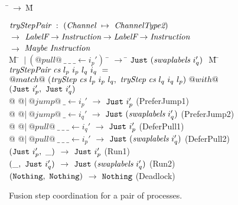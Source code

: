 
\newcommand\note[1]{\textcolor{notec}{(#1)}}

\begin{figure}
\begin{tabbing}
\=$~\to~$\=M\kill

$\textit{tryStepPair} ~:~ (\textit{Channel} ~\mapsto~ \textit{ChannelType2})$ \\
\> $\to$ \> $\textit{LabelF} \to \textit{Instruction} \to \textit{LabelF} \to \textit{Instruction}$ \\
\> $\to$ \> $\textit{Maybe}~\textit{Instruction}$ \\

M \= $~|~(@pull@~\_~\_~\_ \gets i_p')~$ \= $\to$ \= $\texttt{Just}~ (\textit{swaplabels}~i_q')~$ \= M \=\kill
$\textit{tryStepPair} ~\textit{cs}~l_p~i_p~l_q~i_q~=$ \\
\> $@match@~ (\textit{tryStep}~\textit{cs}~l_p~i_p~l_q,~\textit{tryStep}~\textit{cs}~l_q~i_q~l_p) ~@with@$ \\
\> $(\texttt{Just}~ i_p',~\texttt{Just}~ i_q')$ \\

\> @ @$|~@jump@~\_ \gets i_p'$ \> $\to$ \> $\texttt{Just}~ i_p'$
\> \note{PreferJump1} \\[0.5ex]

\> @ @$|~@jump@~\_ \gets i_q'$ \> $\to$ \> $\texttt{Just}~ (\textit{swaplabels}~i_q')$
\> \note{PreferJump2} \\[0.5ex]

\> @ @$|~@pull@~\_~\_~\_ \gets i_q'$ \> $\to$ \> $\texttt{Just}~ i_p'$
\> \note{DeferPull1} \\[0.5ex]

\> @ @$|~@pull@~\_~\_~\_ \gets i_p'$ \> $\to$ \> $\texttt{Just}~ (\textit{swaplabels}~i_q')$
\> \note{DeferPull2} \\[0.5ex]

\> $(\texttt{Just}~ i_p',~\_)$ \> $\to$ \> $\texttt{Just}~ i_p'$
\> \note{Run1} \\[0.5ex]

\> $(\_, ~\texttt{Just}~ i_q')$ \> $\to$ \> $\texttt{Just}~ (\textit{swaplabels}~i_q')$
\> \note{Run2} \\[0.5ex]

\> $(\texttt{Nothing}, ~\texttt{Nothing})$ \> $\to$ \> $\texttt{Nothing}$
\> \note{Deadlock}
\end{tabbing}
\caption{Fusion step coordination for a pair of processes.}
\label{fig:Fusion:Def:StepPair}
\end{figure}


